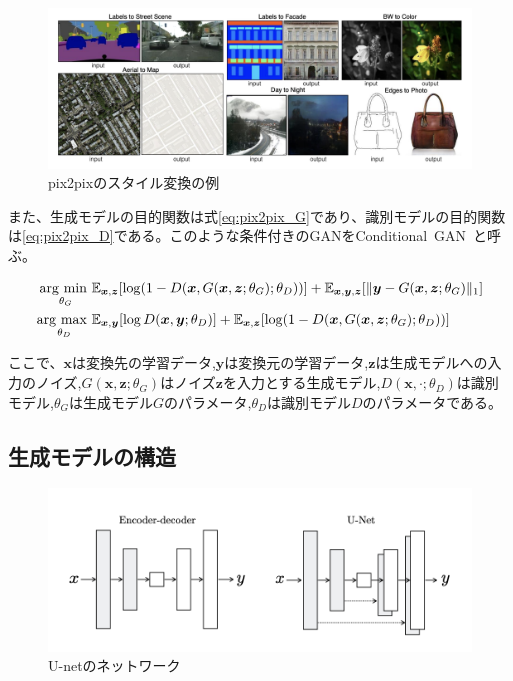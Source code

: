 \begin{figure}[t]
\begin{center}
\includegraphics[width=\hsize]{figure/pix2pix_img.png}
\caption{pix2pixのスタイル変換の例}
\label{fig:pix2pix_img}
\end{center}
\end{figure}

また、生成モデルの目的関数は式\ref{eq:pix2pix_G}であり、識別モデルの目的関数は\ref{eq:pix2pix_D}である。このような条件付きのGANをConditional~GAN~\cite{CGAN}と呼ぶ。

\begin{align}
    \label{eq:pix2pix_G}
    \mathop{\rm arg~min~}\limits _{\theta_G}& \mathbb{E}_{\boldsymbol{x}, \boldsymbol{z}}[\log (1-D(\boldsymbol{x}, G(\boldsymbol{x}, \boldsymbol{z}; \theta_G); \theta_D))]+\mathbb{E}_{\boldsymbol{x}, \boldsymbol{y}, \boldsymbol{z}}[\|\boldsymbol{y}-G(\boldsymbol{x}, \boldsymbol{z}; \theta_G)\|_{1}]\\
    \label{eq:pix2pix_D}
    \mathop{\rm arg~max~}\limits _{\theta_D}& \mathbb{E}_{\boldsymbol{x}, \boldsymbol{y}}[\log D(\boldsymbol{x}, \boldsymbol{y}; \theta_D)]+\mathbb{E}_{\boldsymbol{x}, \boldsymbol{z}}[\log (1-D(\boldsymbol{x}, G(\boldsymbol{x}, \boldsymbol{z}; \theta_G); \theta_D))]
\end{align}


ここで、$\boldsymbol{x}$は変換先の学習データ,$\boldsymbol{y}$は変換元の学習データ,$\boldsymbol{z}$は生成モデルへの入力のノイズ,$G(\boldsymbol{x},\boldsymbol{z};\theta_G)$はノイズ$\boldsymbol{z}$を入力とする生成モデル,$D(\boldsymbol{x},\cdot;\theta_D)$は識別モデル,$\theta_G$は生成モデル$G$のパラメータ,$\theta_D$は識別モデル$D$のパラメータである。

\subsection{生成モデルの構造}

\begin{figure}[t]
\begin{center}
\includegraphics[width=\hsize]{figure/u-net.png}
\caption{U-netのネットワーク}
\label{fig:u-net}
\end{center}
\end{figure}

